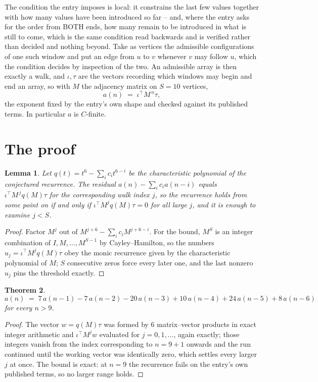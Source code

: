 \documentclass[11pt,a4paper]{article}
\theoremstyle{plain}
\newtheorem{theorem}{Theorem}
\newtheorem{lemma}[theorem]{Lemma}
\theoremstyle{definition}
\begin{document}
The condition the entry imposes is local: it constrains the last few values together with how many values have been introduced so far -- and, where the entry asks for the order from BOTH ends, how many remain to be introduced in what is still to come, which is the same condition read backwards and is verified rather than decided and nothing beyond. Take as vertices the admissible configurations of one such window and put an edge from $u$ to $v$ whenever $v$ may follow $u$, which the condition decides by inspection of the two.
An admissible array is then exactly a walk, and $\iota,\tau$ are the vectors recording which windows may begin and end an array, so with $M$ the adjacency matrix on $S=10$ vertices,
\[
a(n)\;=\;\iota^{\!\top}M^{\,n}\tau ,
\]
the exponent fixed by the entry's own shape and checked against its published terms. In
particular $a$ is $C$-finite.

\section{The proof}

\begin{lemma}\label{lem:crit}
Let $q(t)=t^{6}-\sum_i c_it^{6-i}$ be the characteristic polynomial of the
conjectured recurrence. The residual $a(n)-\sum_ic_ia(n-i)$ equals
$\iota^{\!\top}M^{\,j}q(M)\tau$ for the corresponding walk index $j$, so the recurrence
holds from some point on if and only if $\iota^{\!\top}M^{j}q(M)\tau=0$ for all large $j$,
and it is enough to examine $j<S$.
\end{lemma}

\begin{proof}
Factor $M^{j}$ out of $M^{j+6}-\sum_ic_iM^{j+6-i}$. For the bound, $M^{S}$
is an integer combination of $I,M,\dots,M^{S-1}$ by Cayley--Hamilton, so the numbers
$u_j=\iota^{\!\top}M^{j}q(M)\tau$ obey the monic recurrence given by the characteristic
polynomial of $M$; $S$ consecutive zeros force every later one, and the last nonzero $u_j$
pins the threshold exactly.
\end{proof}

\begin{theorem}
\[
a(n)\;=\;7\,a(n-1) - 7\,a(n-2) - 20\,a(n-3) + 10\,a(n-4) + 24\,a(n-5) + 8\,a(n-6)
\]
for every $n>9$.
\end{theorem}

\begin{proof}
The vector $w=q(M)\tau$ was formed by $6$ matrix--vector products in exact integer
arithmetic and $\iota^{\!\top}M^{j}w$ evaluated for $j=0,1,\dots$, again exactly; those
integers vanish from the index corresponding to $n=9+1$ onwards and the run continued
until the working vector was identically zero, which settles every larger $j$ at once. The bound is exact: at $n=9$ the recurrence fails on the entry's own published terms, so no larger range holds.
\end{proof}
\end{document}

